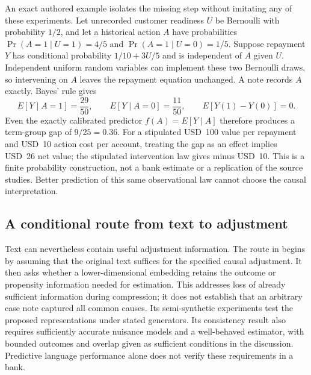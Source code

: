 An exact authored example isolates the missing step without imitating any of
these experiments. Let unrecorded customer readiness $U$ be Bernoulli with
probability $1/2$, and let a historical action $A$ have probabilities
$\Pr(A=1\mid U=1)=4/5$ and $\Pr(A=1\mid U=0)=1/5$. Suppose repayment $Y$ has
conditional probability $1/10+3U/5$ and is independent of $A$ given $U$.
Independent uniform random variables can implement these two Bernoulli draws,
so intervening on $A$ leaves the repayment equation unchanged. A note records
$A$ exactly. Bayes' rule gives
\begin{equation}
 E[Y\mid A=1]=\frac{29}{50},\qquad
 E[Y\mid A=0]=\frac{11}{50},\qquad
 E[Y(1)-Y(0)]=0.
 \label{eq:rel66-confounding}
\end{equation}
Even the exactly calibrated predictor $f(A)=E[Y\mid A]$ therefore produces
a term-group gap of $9/25=0.36$. For a stipulated USD~100 value per repayment
and USD~10 action cost per account, treating the gap as an effect implies
USD~26 net value; the stipulated intervention law gives minus USD~10. This
is a finite probability construction, not a bank estimate or a replication of
the source studies. Better prediction of this same observational law cannot
choose the causal interpretation.

\subsection{A conditional route from text to adjustment}

Text can nevertheless contain useful adjustment information. The route in
\citet{rel66veitch} begins by assuming that the original text suffices for
the specified causal adjustment. It then asks whether a lower-dimensional
embedding retains the outcome or propensity information needed for estimation.
This addresses loss of already sufficient information during compression; it
does not establish that an arbitrary case note captured all common causes.
Its semi-synthetic experiments test the proposed representations under stated
generators. Its consistency result also requires sufficiently accurate nuisance
models and a well-behaved estimator, with bounded outcomes and overlap given
as sufficient conditions in the discussion. Predictive language performance
alone does not verify these requirements in a bank.


